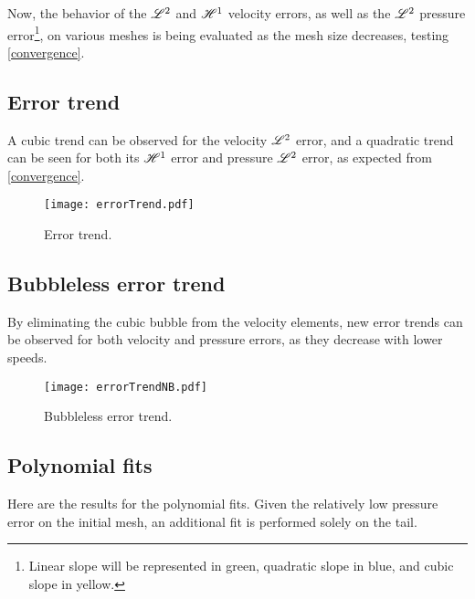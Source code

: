 Now, the behavior of the $\mathscr{L}^2$ and $\mathscr{H}^1$ velocity errors, as well as the $\mathscr{L}^2$ pressure error\footnote{Linear slope will be represented in \textcolor{solarized-green}{green}, quadratic slope in \textcolor{solarized-blue}{blue}, and cubic slope in \textcolor{solarized-yellow}{yellow}.}, on various meshes is being evaluated as the mesh size decreases, testing \ref{convergence}.

\subsection{Error trend}

A cubic trend can be observed for the velocity $\mathscr{L}^2$ error, and a quadratic trend can be seen for both its $\mathscr{H}^1$ error and pressure $\mathscr{L}^2$ error, as expected from \ref{convergence}.

\begin{figure}[!ht]
	\centering
	\texttt{[image: errorTrend.pdf]}
	\caption{Error trend.}
\end{figure}

\newpage
\subsection{Bubbleless error trend}

By eliminating the cubic bubble from the velocity elements, new error trends can be observed for both velocity and pressure errors, as they decrease with lower speeds.

\begin{figure}[!ht]
	\centering
	\texttt{[image: errorTrendNB.pdf]}
	\caption{Bubbleless error trend.}
\end{figure}

\newpage
\subsection{Polynomial fits}

Here are the results for the polynomial fits. Given the relatively low pressure error on the initial mesh, an additional fit is performed solely on the tail. 


